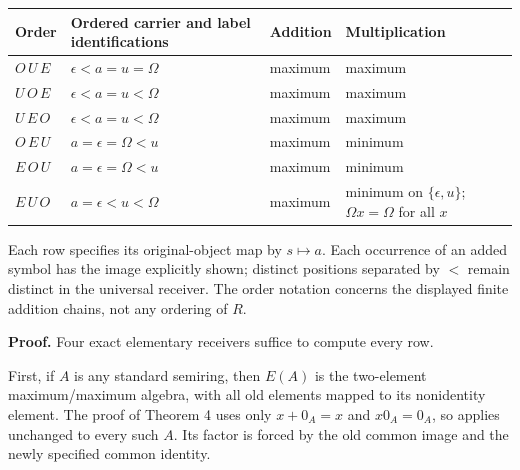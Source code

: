\documentclass[
]{article}
\newcounter{none} %
\begin{document}
{\def\LTcaptype{none} %
\begin{longtable}[]{@{}
  >{\raggedright\arraybackslash}p{}
  >{\raggedright\arraybackslash}p{}
  >{\raggedright\arraybackslash}p{}
  >{\raggedright\arraybackslash}p{}@{}}
\toprule\noalign{}
\begin{minipage}[b]{\linewidth}\raggedright
Order
\end{minipage} & \begin{minipage}[b]{\linewidth}\raggedright
Ordered carrier and label identifications
\end{minipage} & \begin{minipage}[b]{\linewidth}\raggedright
Addition
\end{minipage} & \begin{minipage}[b]{\linewidth}\raggedright
Multiplication
\end{minipage} \\
\midrule\noalign{}
\endhead
\bottomrule\noalign{}
\endlastfoot
\(O\,U\,E\) & \(\epsilon<a=u=\Omega\) & maximum & maximum \\
\(U\,O\,E\) & \(\epsilon<a=u<\Omega\) & maximum & maximum \\
\(U\,E\,O\) & \(\epsilon<a=u<\Omega\) & maximum & maximum \\
\(O\,E\,U\) & \(a=\epsilon=\Omega<u\) & maximum & minimum \\
\(E\,O\,U\) & \(a=\epsilon=\Omega<u\) & maximum & minimum \\
\(E\,U\,O\) & \(a=\epsilon<u<\Omega\) & maximum & minimum on
\(\{\epsilon,u\}\); \(\Omega x=\Omega\) for all \(x\) \\
\end{longtable}
}

Each row specifies its original-object map by \(s\mapsto a\). Each
occurrence of an added symbol has the image explicitly shown; distinct
positions separated by \(<\) remain distinct in the universal receiver.
The order notation concerns the displayed finite addition chains, not
any ordering of \(R\).

\textbf{Proof.} Four exact elementary receivers suffice to compute every
row.

First, if \(A\) is any standard semiring, then \(E(A)\) is the
two-element maximum/maximum algebra, with all old elements mapped to its
nonidentity element. The proof of Theorem 4 uses only \(x+0_A=x\) and
\(x0_A=0_A\), so applies unchanged to every such \(A\). Its factor is
forced by the old common image and the newly specified common identity.
\end{document}
